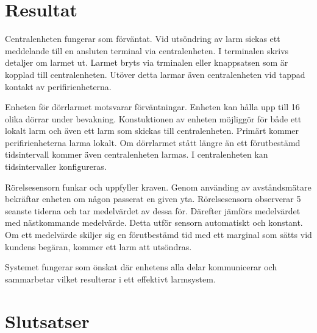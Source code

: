 \documentclass[a4paper]{article}
\begin{document}
\section{Resultat}
Centralenheten fungerar som förväntat. Vid utsöndring av larm sickas ett meddelande till en ansluten terminal via centralenheten. I terminalen skrivs detaljer om larmet ut. Larmet bryts via trminalen eller knappsatsen som är kopplad till centralenheten. Utöver detta larmar även centralenheten vid tappad kontakt av perifirienheterna. 

Enheten för dörrlarmet motsvarar förväntningar. Enheten kan hålla upp till 16 olika dörrar under bevakning. Konstuktionen av enheten möjliggör för både ett lokalt larm och även ett larm som skickas till centralenheten. Primärt kommer perifirienheterna larma lokalt. Om dörrlarmet stått längre än ett förutbestämd tidsintervall kommer även centralenheten larmas. I centralenheten kan tidsintervaller konfigureras. 

Rörelsesensorn funkar och uppfyller kraven. Genom använding av avståndsmätare bekräftar enheten om någon passerat en given yta. Rörelsesensorn observerar 5 seanste tiderna och tar medelvärdet av dessa för. Därefter jämförs medelvärdet med nästkommande medelvärde. Detta utför sensorn automatiskt och konstant. Om ett medelvärde skiljer sig en förutbestämd tid med ett marginal som sätts vid kundens begäran, kommer ett larm att utsöndras. 

Systemet fungerar som önskat där enhetens alla delar kommunicerar och sammarbetar vilket resulterar i ett effektivt larmsystem. 

\section{Slutsatser}




\end{document}
